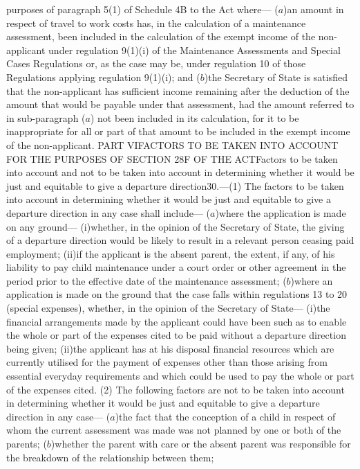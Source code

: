 \documentclass[a4paper]{article}
\begin{document}
purposes of paragraph 5(1) of Schedule 4B to the Act where—
($a$)an amount in respect of travel to work costs has, in the calculation of a
maintenance assessment, been included in the calculation of the exempt income of
the non-applicant under regulation 9(1)(i) of the Maintenance Assessments and
Special Cases Regulations or, as the case may be, under regulation 10 of those
Regulations applying regulation 9(1)(i); and
($b$)the Secretary of State is satisfied that the non-applicant has sufficient
income remaining after the deduction of the amount that would be payable under
that assessment, had the amount referred to in sub-paragraph ($a$) not been
included in its calculation, for it to be inappropriate for all or part of that
amount to be included in the exempt income of the non-applicant.
PART VIFACTORS TO BE TAKEN INTO ACCOUNT FOR THE PURPOSES OF SECTION 28F OF THE
ACTFactors to be taken into account and not to be taken into account in
determining whether it would be just and equitable to give a departure
direction30.—(1) The factors to be taken into account in determining whether it
would be just and equitable to give a departure direction in any case shall
include—
($a$)where the application is made on any ground—
(i)whether, in the opinion of the Secretary of State, the giving of a departure
direction would be likely to result in a relevant person ceasing paid
employment;
(ii)if the applicant is the absent parent, the extent, if any, of his liability
to pay child maintenance under a court order or other agreement in the period
prior to the effective date of the maintenance assessment;
($b$)where an application is made on the ground that the case falls within
regulations 13 to 20 (special expenses), whether, in the opinion of the
Secretary of State—
(i)the financial arrangements made by the applicant could have been such as to
enable the whole or part of the expenses cited to be paid without a departure
direction being given;
(ii)the applicant has at his disposal financial resources which are currently
utilised for the payment of expenses other than those arising from essential
everyday requirements and which could be used to pay the whole or part of the
expenses cited.
(2) The following factors are not to be taken into account in determining
whether it would be just and equitable to give a departure direction in any
case—
($a$)the fact that the conception of a child in respect of whom the current
assessment was made was not planned by one or both of the parents;
($b$)whether the parent with care or the absent parent was responsible for the
breakdown of the relationship between them;
\end{document}
